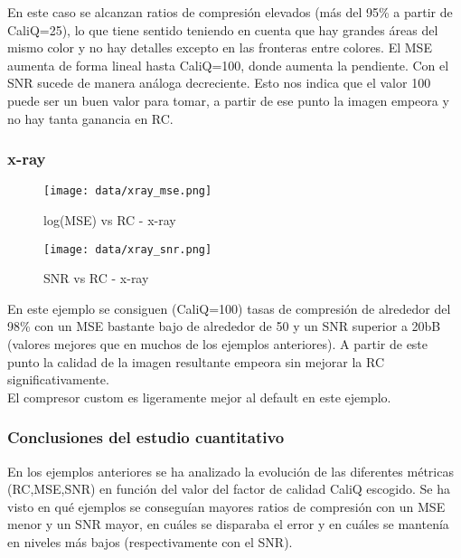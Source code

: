 \documentclass[12pt,a4paper]{article}
\begin{document}
En este caso se alcanzan ratios de compresión elevados (más del 95\% a partir de CaliQ=25), lo que tiene sentido teniendo en cuenta que hay grandes áreas del mismo color y no hay detalles excepto en las fronteras entre colores. El MSE aumenta de forma lineal hasta CaliQ=100, donde aumenta la pendiente. Con el SNR sucede de manera análoga decreciente. Esto nos indica que el valor 100 puede ser un buen valor para tomar, a partir de ese punto la imagen empeora y no hay tanta ganancia en RC.

\subsubsection{x-ray}
\hspace*{-2.5em}
\begin{minipage}{0.5\textwidth}
        \centering
        \begin{figure}[H]
    \centering
    \texttt{[image: data/xray\_mse.png]}
    \caption{log(MSE) vs RC - x-ray}
    
\end{figure}
\end{minipage}\hfill
    \begin{minipage}{0.5\textwidth}
        \centering
        \begin{figure}[H]
    \centering
    \texttt{[image: data/xray\_snr.png]}
    \caption{SNR vs RC - x-ray}
    
\end{figure}
\end{minipage}
\vspace{2em}

En este ejemplo se consiguen (CaliQ=100) tasas de compresión de alrededor del 98\% con un MSE bastante bajo de alrededor de 50 y un SNR superior a 20bB (valores mejores que en muchos de los ejemplos anteriores). A partir de este punto la calidad de la imagen resultante empeora sin mejorar la RC significativamente.\\

El compresor custom es ligeramente mejor al default en este ejemplo.

\subsubsection{Conclusiones del estudio cuantitativo}
En los ejemplos anteriores se ha analizado la evolución de las diferentes métricas (RC,MSE,SNR) en función del valor del factor de calidad CaliQ escogido. Se ha visto en qué ejemplos se conseguían mayores ratios de compresión con un MSE menor y un SNR mayor, en cuáles se disparaba el error y en cuáles se mantenía en niveles más bajos (respectivamente con el SNR).\\
\end{document}
